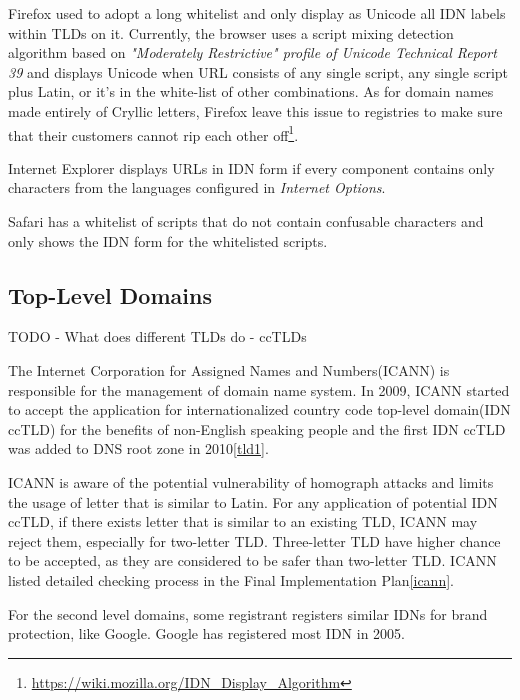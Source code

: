 \documentclass[letterpaper,twocolumn,10pt]{article}
\begin{document}
Firefox used to adopt a long whitelist and only display as Unicode all IDN labels within TLDs on it. Currently, the browser uses a script mixing detection algorithm based on \textit{"Moderately Restrictive" profile of Unicode Technical Report 39} and displays Unicode when URL consists of any single script, any single script plus Latin, or it's in the white-list of other combinations.
As for domain names made entirely of Cryllic letters, Firefox leave this issue to registries to make sure that their customers cannot rip each other off\footnote{\url{https://wiki.mozilla.org/IDN_Display_Algorithm}}.

Internet Explorer displays URLs in IDN form if every component contains only characters from the languages configured in \textit{Internet Options}. %

Safari has a whitelist of scripts that do not contain confusable characters and only shows the IDN form for the whitelisted scripts.

\subsection{Top-Level Domains}
TODO
- What does different TLDs do
- ccTLDs

The Internet Corporation for Assigned Names and Numbers(ICANN) is responsible for the management of domain name system. In 2009, ICANN started to accept the application for internationalized country code top-level domain(IDN ccTLD) for the benefits of non-English speaking people and the first IDN ccTLD was added to DNS root zone in 2010\ref{tld1}.

ICANN is aware of the potential vulnerability of homograph attacks and limits the usage of letter that is similar to Latin. For any application of potential IDN ccTLD, if there exists letter that is similar to an existing TLD, ICANN may reject them, especially for two-letter TLD. Three-letter TLD have higher chance to be accepted, as they are considered to be safer than two-letter TLD. ICANN listed detailed checking process in the Final Implementation Plan\ref{icann}.

For the second level domains, some registrant registers similar IDNs for brand protection, like Google. Google has registered most IDN in 2005.
\end{document}
